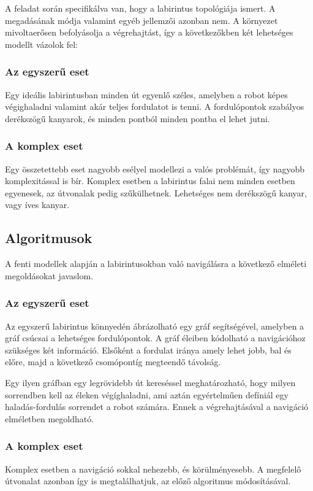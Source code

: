 A feladat során specifikálva van, hogy a labirintus topológiája ismert. A
megadásának módja valamint egyéb jellemzői azonban nem. A környezet mivoltaerősen
befolyásolja a végrehajtást, így a következőkben két lehetséges modellt vázolok
fel:

\subsubsection{Az egyszerű eset}
Egy ideális labirintusban minden út egyenlő széles, amelyben a robot képes
végighaladni valamint akár teljes fordulatot is tenni. A fordulópontok szabályos
derékszögű kanyarok, és minden pontból minden pontba el lehet jutni.

\subsubsection{A komplex eset}
Egy összetettebb eset nagyobb esélyel modellezi a valós problémát, így nagyobb
komplexitással is bír. Komplex esetben a labirintus falai nem minden esetben
egyenesek, az útvonalak pedig szűkülhetnek. Lehetséges nem derékszögű kanyar,
vagy íves kanyar. 

\subsection{Algoritmusok}

A fenti modellek alapján a labirintusokban való navigálásra a következő elméleti
megoldásokat javaslom.

\subsubsection{Az egyszerű eset}
Az egyszerű labirintus könnyedén ábrázolható egy gráf segítségével, amelyben a
gráf csúcsai a lehetséges fordulópontok. A gráf éleiben kódolható a navigációhoz
szükséges két információ. Elsőként a fordulat iránya amely lehet  jobb, bal és
előre, majd a következő csomópontíg megteendő távolság.

Egy ilyen gráfban egy legrövidebb út kereséssel meghatározható, hogy milyen
sorrendben kell az éleken végíghaladni, ami aztán egyértelműen defíniál egy
haladás-fordulás sorrendet a robot számára. Ennek a végrehajtásával a navigáció 
elméletben megoldható.

\subsubsection{A komplex eset}
Komplex esetben a navigáció sokkal nehezebb, és körülményesebb. A megfelelő
útvonalat azonban így is megtalálhatjuk, az előző algoritmus módosításával.

